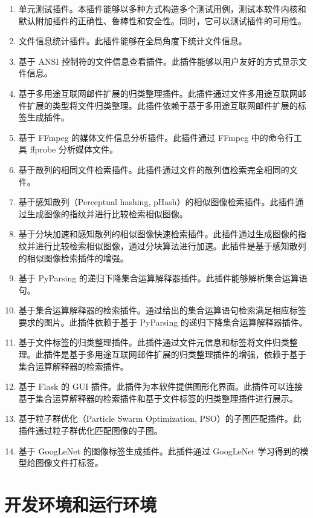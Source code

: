 \begin{enumerate}
    \item 单元测试插件。本插件能够以多种方式构造多个测试用例，测试本软件内核和默认附加插件的正确性、鲁棒性和安全性。同时，它可以测试插件的可用性。 %
    \item 文件信息统计插件。此插件能够在全局角度下统计文件信息。 %
    \item 基于 ANSI 控制符的文件信息查看插件。此插件能够以用户友好的方式显示文件信息。 %
    \item 基于多用途互联网邮件扩展的归类整理插件。此插件通过文件多用途互联网邮件扩展的类型将文件归类整理。此插件依赖于基于多用途互联网邮件扩展的标签生成插件。 %
    \item 基于 FFmpeg 的媒体文件信息分析插件。此插件通过 FFmpeg 中的命令行工具 ffprobe 分析媒体文件。 %
    \item 基于散列的相同文件检索插件。此插件通过文件的散列值检索完全相同的文件。 %
    \item 基于感知散列（Perceptual hashing, pHash）的相似图像检索插件。此插件通过生成图像的指纹并进行比较检索相似图像。 %
    \item 基于分块加速和感知散列的相似图像快速检索插件。此插件通过生成图像的指纹并进行比较检索相似图像，通过分块算法进行加速。此插件是基于感知散列的相似图像检索插件的增强。 %
    \item 基于 PyParsing 的递归下降集合运算解释器插件。此插件能够解析集合运算语句。 %
    \item 基于集合运算解释器的检索插件。通过给出的集合运算语句检索满足相应标签要求的图片。此插件依赖于基于 PyParsing 的递归下降集合运算解释器插件。 %
    \item 基于文件标签的归类整理插件。此插件通过文件元信息和标签将文件归类整理。此插件是基于多用途互联网邮件扩展的归类整理插件的增强，依赖于基于集合运算解释器的检索插件。 %
    \item 基于 Flask 的 GUI 插件。此插件为本软件提供图形化界面。此插件可以连接基于集合运算解释器的检索插件和基于文件标签的归类整理插件进行展示。 %
    \item 基于粒子群优化（Particle Swarm Optimization, PSO）的子图匹配插件。此插件通过粒子群优化匹配图像的子图。 %
    \item 基于 GoogLeNet 的图像标签生成插件。此插件通过 GoogLeNet 学习得到的模型给图像文件打标签。 %
\end{enumerate}

\section{开发环境和运行环境}


